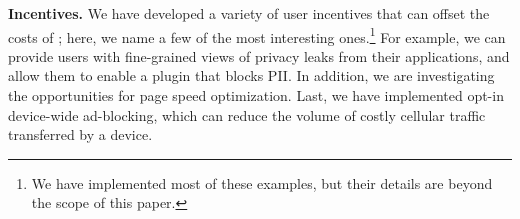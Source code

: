\noindent\textbf{Incentives.} We have developed a variety of user incentives that can offset the costs of 
\platname{}; here, we name a few of the most interesting ones.\footnote{We have implemented most of these examples, 
but their details are beyond the scope of this paper.} For example, 
we can provide users with fine-grained views of privacy leaks from 
their applications, and allow them to enable a \platname{} plugin that 
blocks PII. In addition, we are investigating the opportunities for page 
speed optimization. Last, we have implemented opt-in device-wide ad-blocking, 
which can reduce the volume of costly cellular traffic transferred by a device. 


%
%
%
%
%
%
